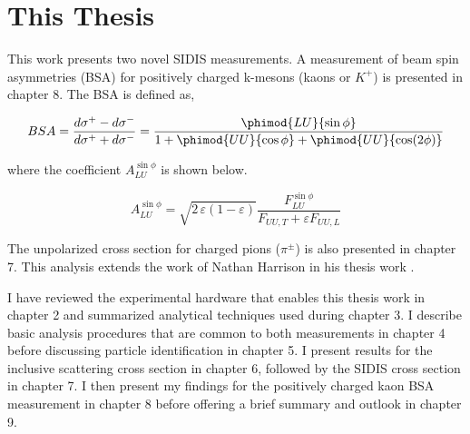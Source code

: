 \section{This Thesis}
This work presents two novel SIDIS measurements.  A measurement of beam spin asymmetries (BSA) for positively charged k-mesons (kaons or $K^+$) is presented in chapter 8.  The BSA is defined as, 

\begin{equation}
  BSA = \frac{d\sigma^+ - d\sigma^-}{d\sigma^+ + d\sigma^-} = \frac{\phimod{LU}{\sin\phi}}{1 + \phimod{UU}{\cos\phi} + \phimod{UU}{\cos(2\phi)}}
\end{equation}

where the coefficient $A_{LU}^{\sin\phi}$ is shown below.

\begin{equation}
  A_{LU}^{\sin\phi} = \sqrt{2\,\varepsilon (1-\varepsilon)} \frac{F_{LU}^{\sin\phi}}{F_{UU,T} + \varepsilon F_{UU,L}}
\end{equation}

The unpolarized cross section for charged pions ($\pi^{\pm}$) is also presented in chapter 7.  This analysis extends the work of Nathan Harrison in his thesis work \cite{theses-harrison:2015}.


I have reviewed the experimental hardware that enables this thesis work in chapter 2 and summarized analytical techniques used during chapter 3.  I describe basic analysis procedures that are common to both measurements in chapter 4 before discussing particle identification in chapter 5.  I present results for the inclusive scattering cross section in chapter 6, followed by the SIDIS cross section in chapter 7.  I then present my findings for the positively charged kaon BSA measurement in chapter 8 before offering a brief summary and outlook in chapter 9. 

